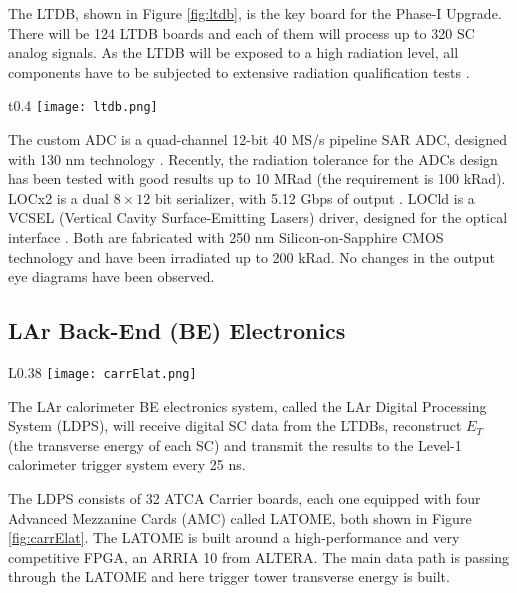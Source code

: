 \documentclass{llncs}
\begin{document}
The LTDB, shown in Figure \ref{fig:ltdb}, is the key board for the Phase-I Upgrade. There will be 124 LTDB boards and each of them will process up to 320 SC analog signals. As the LTDB will be exposed to a high radiation level, all components have to be subjected to extensive radiation qualification tests \cite{Buchanan:1151347}.

\begin{wrapfigure}{t}{0.4\textwidth}
\vspace{-25pt}
  \centering
    \texttt{[image: ltdb.png]}
  \caption{LTDB board under test.}
  \label{fig:ltdb}
 \vspace{-20pt}
\end{wrapfigure}
The custom ADC is a quad-channel 12-bit 40 MS/s pipeline SAR ADC, designed with 130 nm technology \cite{Xu:2229579}. 
Recently, the radiation tolerance for the ADCs design has been tested with good results up to 10 MRad (the requirement is 100 kRad).
LOCx2 is a dual $8\times12$ bit serializer, with 5.12 Gbps of output \cite{1748-0221-11-02-C02013}. 
LOCld is a VCSEL (Vertical Cavity Surface-Emitting Lasers) driver, designed for the optical interface \cite{1748-0221-8-01-C01031}. Both are fabricated with 250 nm Silicon-on-Sapphire CMOS technology and have been irradiated up to 200 kRad. No changes in the output eye diagrams have been observed.

\subsection{LAr Back-End (BE) Electronics}
\begin{wrapfigure}{L}{0.38\textwidth}
\vspace{-25pt}
  \centering
    \texttt{[image: carrElat.png]}
	\caption{ATCA Carrier and LATOME board.}
	\label{fig:carrElat}
 \vspace{-20pt}
\end{wrapfigure}
The LAr calorimeter BE electronics system, called the LAr Digital Processing System (LDPS), will receive digital SC data from the LTDBs, reconstruct $E_{T}$ (the transverse energy of each SC) and transmit the results to the Level-1 calorimeter trigger system every 25 ns.

The LDPS consists of 32 ATCA Carrier boards, each one equipped with four Advanced Mezzanine Cards (AMC) called LATOME, both shown in Figure \ref{fig:carrElat}. 
The LATOME is built around a high-performance and very competitive FPGA, an ARRIA 10 from ALTERA. The main data path is passing through the LATOME and here trigger tower transverse energy is built.
\end{document}
